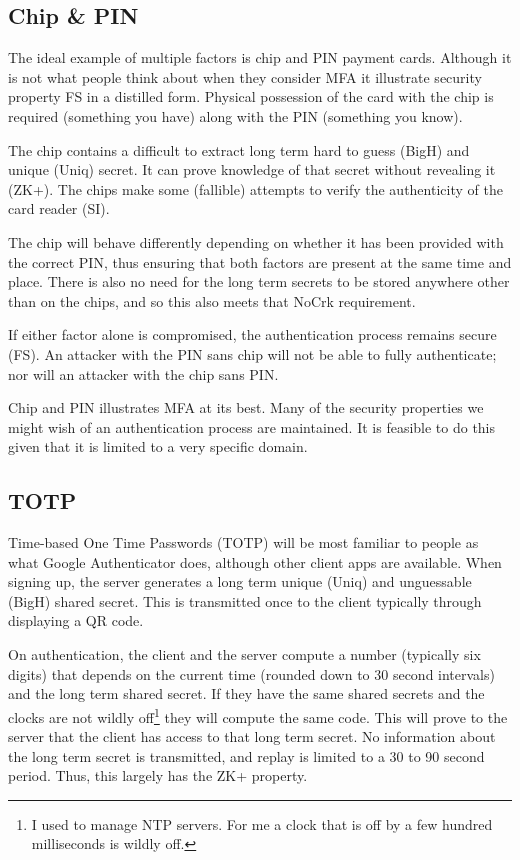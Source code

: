 \documentclass{soups}
\newcommand{\prop}[1]{\textsf{#1}}
\begin{document}
\subsection{Chip \& PIN}

The ideal example of multiple factors is chip and PIN payment cards. Although it is not what people think about when they consider MFA it illustrate security property \prop{FS} in a distilled form.
Physical possession of the card with the chip is required (something you have) along with the PIN (something you know).

The chip contains a difficult to extract long term hard to guess (\prop{BigH}) and unique (\prop{Uniq}) secret. It can prove knowledge of that secret without revealing it (\prop{ZK+}). The chips make some (fallible) attempts to verify the authenticity of the card reader (\prop{SI}).

The chip will behave differently depending on whether it has been provided with the correct PIN, thus ensuring that both factors are present at the same time and place. There is also no need for the long term secrets to be stored anywhere other than on the chips, and so this also meets that \prop{NoCrk} requirement.

If either factor alone is compromised, the authentication process remains secure (\prop{FS}).
An attacker with the PIN sans chip will not be able to fully authenticate; nor will an attacker with the chip sans PIN\@.


Chip and PIN illustrates MFA at its best. Many of the security properties we might wish of an authentication process are maintained. It is feasible to do this given that it is limited to a very specific domain.

\subsection{TOTP}\label{sec:totp}

Time-based One Time Passwords (TOTP) will be most familiar to people as what Google Authenticator does, although other client apps are available.
When signing up, the server generates a long term unique (\prop{Uniq}) and unguessable (\prop{BigH}) shared secret. This is transmitted once to the client typically through displaying a QR code. 

On authentication, the client and the server compute a number (typically six digits) that depends on the current time (rounded down to 30 second intervals) and the long term shared secret.
If they have the same shared secrets and the clocks are not wildly off\footnote{I used to manage NTP servers. For me a clock that is off by a few hundred milliseconds is wildly off.} they will compute the same code. This will prove to the server that the client has access to that long term secret. No information about the long term secret is transmitted, and replay is limited to a 30 to 90 second period.
Thus, this largely has the \prop{ZK+} property.
\end{document}
